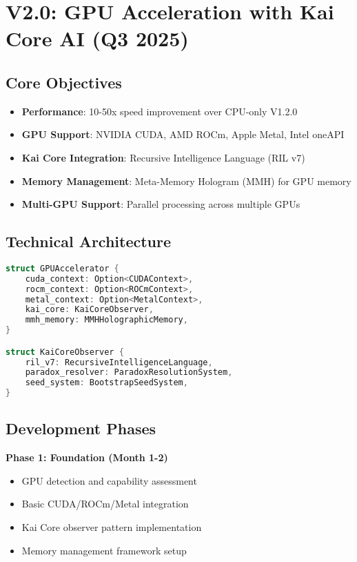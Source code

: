 \documentclass[12pt,a4paper]{article}
\begin{document}
\newpage

\section{V2.0: GPU Acceleration with Kai Core AI (Q3 2025)}

\subsection{Core Objectives}
\begin{itemize}
    \item \textbf{Performance}: 10-50x speed improvement over CPU-only V1.2.0
    \item \textbf{GPU Support}: NVIDIA CUDA, AMD ROCm, Apple Metal, Intel oneAPI
    \item \textbf{Kai Core Integration}: Recursive Intelligence Language (RIL v7)
    \item \textbf{Memory Management}: Meta-Memory Hologram (MMH) for GPU memory
    \item \textbf{Multi-GPU Support}: Parallel processing across multiple GPUs
\end{itemize}

\subsection{Technical Architecture}
\begin{lstlisting}[language=C, caption=V2.0 GPU Architecture]
struct GPUAccelerator {
    cuda_context: Option<CUDAContext>,
    rocm_context: Option<ROCmContext>,
    metal_context: Option<MetalContext>,
    kai_core: KaiCoreObserver,
    mmh_memory: MMHHolographicMemory,
}

struct KaiCoreObserver {
    ril_v7: RecursiveIntelligenceLanguage,
    paradox_resolver: ParadoxResolutionSystem,
    seed_system: BootstrapSeedSystem,
}
\end{lstlisting}

\subsection{Development Phases}
\textbf{Phase 1: Foundation (Month 1-2)}
\begin{itemize}
    \item GPU detection and capability assessment
    \item Basic CUDA/ROCm/Metal integration
    \item Kai Core observer pattern implementation
    \item Memory management framework setup
\end{itemize}
\end{document}

